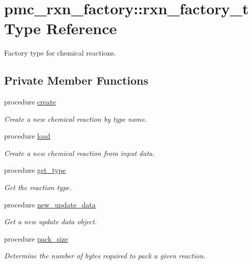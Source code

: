 \hypertarget{structpmc__rxn__factory_1_1rxn__factory__t}{}\section{pmc\+\_\+rxn\+\_\+factory\+:\+:rxn\+\_\+factory\+\_\+t Type Reference}
\label{structpmc__rxn__factory_1_1rxn__factory__t}


Factory type for chemical reactions.  


\subsection*{Private Member Functions}
\begin{DoxyCompactItemize}
\item 
procedure \mbox{\hyperlink{structpmc__rxn__factory_1_1rxn__factory__t_acce57e7c7bcdf000102101aefe8d9ade}{create}}
\begin{DoxyCompactList}\small\item\em Create a new chemical reaction by type name. \end{DoxyCompactList}\item 
procedure \mbox{\hyperlink{structpmc__rxn__factory_1_1rxn__factory__t_a60ed939b436b09ac0e60c43c70a69c8a}{load}}
\begin{DoxyCompactList}\small\item\em Create a new chemical reaction from input data. \end{DoxyCompactList}\item 
procedure \mbox{\hyperlink{structpmc__rxn__factory_1_1rxn__factory__t_a04060dbe24fcf958a0567efb98203ea3}{get\+\_\+type}}
\begin{DoxyCompactList}\small\item\em Get the reaction type. \end{DoxyCompactList}\item 
procedure \mbox{\hyperlink{structpmc__rxn__factory_1_1rxn__factory__t_a1ee2c4fcd1b457908a8df5ad18a302cd}{new\+\_\+update\+\_\+data}}
\begin{DoxyCompactList}\small\item\em Get a new update data object. \end{DoxyCompactList}\item 
procedure \mbox{\hyperlink{structpmc__rxn__factory_1_1rxn__factory__t_a82b8d1f5b408d4ed30004629cb83b898}{pack\+\_\+size}}
\begin{DoxyCompactList}\small\item\em Determine the number of bytes required to pack a given reaction. \end{DoxyCompactList}\item 

\end{DoxyCompactItemize}
